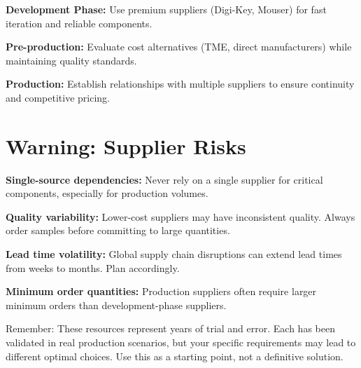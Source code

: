 \textbf{Development Phase:}
Use premium suppliers (Digi-Key, Mouser) for fast iteration and reliable components.

\textbf{Pre-production:}
Evaluate cost alternatives (TME, direct manufacturers) while maintaining quality standards.

\textbf{Production:}
Establish relationships with multiple suppliers to ensure continuity and competitive pricing.

\section{Warning: Supplier Risks}

\begin{tcolorbox}[colback=red!10,colframe=red!75!black,title=Critical Supplier Considerations]
\textbf{Single-source dependencies:} Never rely on a single supplier for critical components, especially for production volumes.

\textbf{Quality variability:} Lower-cost suppliers may have inconsistent quality. Always order samples before committing to large quantities.

\textbf{Lead time volatility:} Global supply chain disruptions can extend lead times from weeks to months. Plan accordingly.

\textbf{Minimum order quantities:} Production suppliers often require larger minimum orders than development-phase suppliers.
\end{tcolorbox}

Remember: These resources represent years of trial and error. Each has been validated in real production scenarios, but your specific requirements may lead to different optimal choices. Use this as a starting point, not a definitive solution.